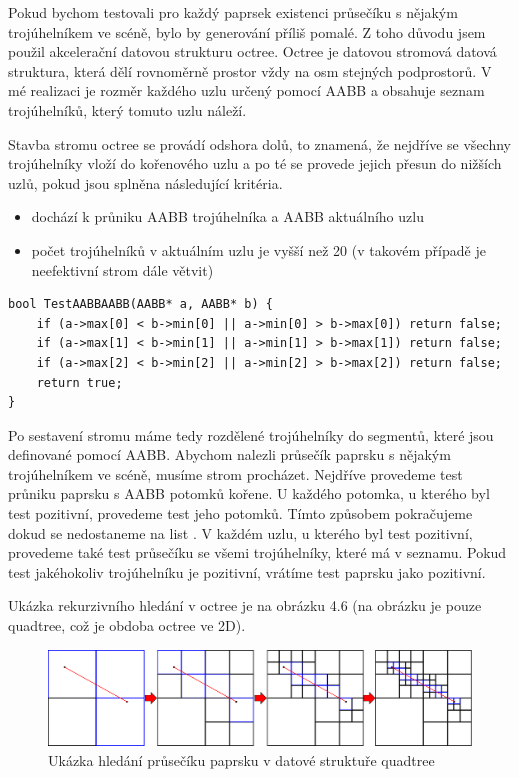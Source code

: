 \documentclass[11pt,twoside,a4paper]{book}
\begin{document}
Pokud bychom testovali pro každý paprsek existenci průsečíku s nějakým trojúhelníkem ve scéně, bylo by generování příliš pomalé. Z toho důvodu jsem použil akcelerační datovou strukturu octree. Octree je datovou stromová datová struktura, která dělí rovnoměrně prostor vždy na osm stejných podprostorů. V mé realizaci je rozměr každého uzlu určený pomocí AABB a obsahuje seznam trojúhelníků, který tomuto uzlu náleží.

Stavba stromu octree se provádí odshora dolů, to znamená, že nejdříve se všechny trojúhelníky vloží do kořenového uzlu a po té se provede jejich přesun do nižších uzlů, pokud jsou splněna následující kritéria.
\begin{itemize}
\item dochází k průniku AABB trojúhelníka a AABB aktuálního uzlu
\item počet trojúhelníků v aktuálním uzlu je vyšší než 20 (v takovém případě je neefektivní strom dále větvit)
\end{itemize}

\lstset{language=C++} 
\begin{lstlisting}[caption=Průnik dvou AABB ve 3D]
bool TestAABBAABB(AABB* a, AABB* b) {
    if (a->max[0] < b->min[0] || a->min[0] > b->max[0]) return false;
    if (a->max[1] < b->min[1] || a->min[1] > b->max[1]) return false;
    if (a->max[2] < b->min[2] || a->min[2] > b->max[2]) return false;
    return true;
}
\end{lstlisting}

Po sestavení stromu máme tedy rozdělené trojúhelníky do segmentů, které jsou definované pomocí AABB. Abychom nalezli průsečík paprsku s nějakým trojúhelníkem ve scéně, musíme strom procházet. Nejdříve provedeme test průniku paprsku s AABB potomků kořene. U každého potomka, u kterého byl test pozitivní, provedeme test jeho potomků. Tímto způsobem pokračujeme dokud se nedostaneme na list . V každém uzlu, u kterého byl test pozitivní, provedeme také test průsečíku se všemi trojúhelníky, které má v seznamu. Pokud test jakéhokoliv trojúhelníku je pozitivní, vrátíme test paprsku jako pozitivní.

Ukázka rekurzivního hledání v octree je na obrázku 4.6 (na obrázku je pouze quadtree, což je obdoba octree ve 2D).

\begin{center}
\begin{figure}[h]
\includegraphics[width=150mm]{figures/quadtree.png}
\caption{Ukázka hledání průsečíku paprsku v datové struktuře quadtree}
\end{figure}
\end{center}
\end{document}
